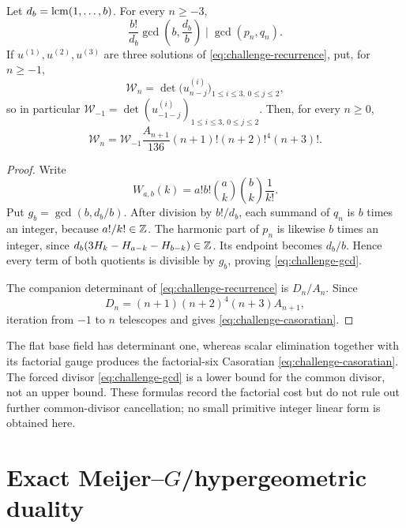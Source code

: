 \begin{proposition}
\label{prop:challenge-arithmetic}
Let \(d_b=\operatorname{lcm}(1,\ldots,b)\).  For every \(n\ge-3\),
\begin{equation}\label{eq:challenge-gcd}
 \boxed{\displaystyle
 \frac{b!}{d_b}\gcd\!\left(b,\frac{d_b}{b}\right)
 \mid\gcd(p_n,q_n).}
\end{equation}
If \(u^{(1)},u^{(2)},u^{(3)}\) are three solutions of
\eqref{eq:challenge-recurrence}, put, for \(n\ge-1\),
\[
 \mathcal W_n=\det\bigl(u^{(i)}_{n-j}\bigr)_{1\le i\le3,\,0\le j\le2},
\]
so in particular
\(\mathcal W_{-1}=\det(u^{(i)}_{-1-j})_{1\le i\le3,\,0\le j\le2}\).
Then, for every \(n\ge0\),
\begin{equation}\label{eq:challenge-casoratian}
 \boxed{\displaystyle
 \mathcal W_n=\mathcal W_{-1}
 \frac{A_{n+1}}{136}
 (n+1)!(n+2)!^4(n+3)!.}
\end{equation}
\end{proposition}

\begin{proof}
Write
\[
 W_{a,b}(k)=a!b!\binom ak\binom bk\frac1{k!}.
\]
Put \(g_b=\gcd(b,d_b/b)\).  After division by \(b!/d_b\), each summand of
\(q_n\) is \(b\) times an integer, because \(a!/k!\in\mathbb Z\).  The harmonic
part of \(p_n\) is likewise \(b\) times an integer, since
\(d_b(3H_k-H_{a-k}-H_{b-k})\in\mathbb Z\).  Its endpoint becomes \(d_b/b\).
Hence every term of both quotients is divisible by \(g_b\), proving
\eqref{eq:challenge-gcd}.

The companion determinant of \eqref{eq:challenge-recurrence} is
\(D_n/A_n\).  Since
\[
 D_n=(n+1)(n+2)^4(n+3)A_{n+1},
\]
iteration from \(-1\) to \(n\) telescopes and gives
\eqref{eq:challenge-casoratian}.
\end{proof}

\begin{remark}
The flat base field has determinant one, whereas scalar elimination together
with its factorial gauge produces the factorial-six Casoratian
\eqref{eq:challenge-casoratian}.  The forced divisor
\eqref{eq:challenge-gcd} is a lower bound for the common divisor, not an
upper bound.  These formulas record the factorial cost but do not rule out
further common-divisor cancellation; no small primitive integer linear form
is obtained here.
\end{remark}

\section{Exact Meijer--\texorpdfstring{\(G\)}{G}/hypergeometric duality}
\label{sec:meijer-duality}

